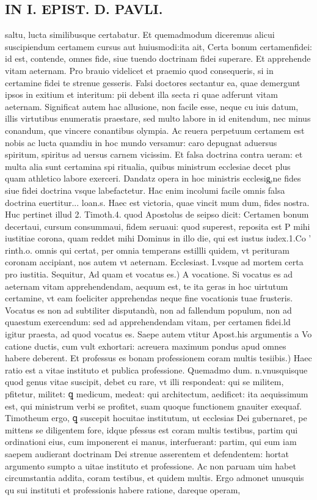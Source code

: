 \documentclass{article}
\begin{document}
\begin{pages}
\section*{IN I. EPIST. D. PAVLI. }
\marginpar{[ p.128 ]}\pstart saltu, lucta similibusque certabatur. Et quemadmodum diceremus alicui suscipiendum certamem cursus aut huiusmodi:ita ait, Certa bonum certamenfidei: id est, contende, omnes fide, siue tuendo doctrinam fidei superare. Et apprehende vitam aeternam. Pro brauio videlicet et praemio quod consequeris, si in certamine fidei te strenue gesseris. Falsi doctores sectantur ea, quae demergunt ipsos in exitium et interitum: pii debent illa secta ri quae adferunt vitam aeternam. Significat autem hac allusione, non facile esse, neque cu iuis datum, illis virtutibus enumeratis praestare, sed multo labore in id enitendum, nec minus conandum, que vincere conantibus olympia. Ac reuera perpetuum certamem est nobis ac lucta quamdiu in hoc mundo versamur: caro depugnat aduersus spiritum, spiritus ad uersus carnem vicissim. Et falsa doctrina contra ueram: et multa alia sunt certamina spi ritualia, quibus ministrum ecclesiae decet plus quam athletico labore exerceri. Dandatz opera in hoc ministris ecclesig̨,ne fides siue fidei doctrina vsque labefactetur. Hac enim incolumi facile omnis falsa doctrina euertitur... loan.s. Haec est victoria, quae vincit mum dum, fides nostra. Huc pertinet illud 2. Timoth.4. quod Apostolus de seipso dicit: Certamen bonum decertaui, cursum consummaui, fidem seruaui: quod superest, reposita est P mihi iustitiae corona, quam reddet mihi Dominus in illo die, qui est iustus iudex.1.Co ' rinth.o. omnis qui certat, per omnia temperans estillli quidem, vt perituram coronam accipiant, nos autem vt aeternam. Ecclesiast. I.vsque ad mortem certa pro iustitia. Sequitur,  \pend\pstart Ad quam et vocatus es.) A vocatione. Si vocatus es ad aeternam vitam apprehendendam, aequum est, te ita geras in hoc uirtutum certamine, vt eam foeliciter apprehendas neque fine vocationis tuae frusteris. Vocatus es non ad subtiliter disputandù, non ad fallendum populum, non ad quaestum exercendum: sed ad apprehendendam vitam, per certamen fidei.ld igitur praesta, ad quod vocatus es. Saepe autem vtitur Apost.his argumentis a Vo catione ductis, cum vult exhortari: acreuera maximum pondus apud omnes habere deberent.  \pend\pstart Et professus es bonam professionem coram multis tesiibis.) Haec ratio est a vitae instituto et publica professione. Quemadmo dum. n.vnusquisque quod genus vitae suscipit, debet cu rare, vt illi respondeat: qui se militem, pfitetur, militet: ꝗ medicum, medeat: qui architectum, aedificet: ita aequissimum est, qui ministrum verbi se profitet, suam quoque functionem gnauiter exequaf. Timotheum ergo, ꝗ suscepit hocuitae institutum, ut ecclesias Dei gubernaret, pe mittens se diligentem fore, idque pfessus est coram multis testibus, partim qui ordinationi eius, cum imponerent ei manus, interfuerant: partim, qui eum iam saepem audierant doctrinam Dei strenue asserentem et defendentem: hortat argumento sumpto a uitae instituto et professione. Ac non paruam uim habet circumstantia addita, coram testibus, et quidem multis. Ergo admonet unusquis qu sui instituti et professionis habere ratione, dareque operam, 
\end{pages}
\end{document}
